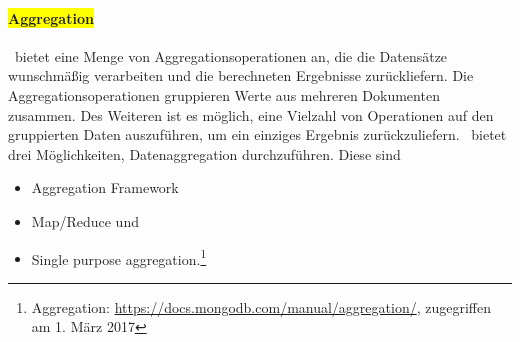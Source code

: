 %
%
%
%
%
%

\paragraph{\colorbox{yellow}{Aggregation}}\label{aggr}
\mongo\ bietet eine Menge von Aggregationsoperationen an, die die Datensätze wunschmäßig verarbeiten und die berechneten Ergebnisse zurückliefern. Die Aggregationsoperationen gruppieren Werte aus mehreren Dokumenten zusammen. Des Weiteren ist es möglich, eine Vielzahl von Operationen auf den gruppierten Daten auszuführen, um ein einziges Ergebnis zurückzuliefern. \mongo\ bietet drei Möglichkeiten, Datenaggregation durchzuführen. Diese sind 
\begin{itemize}
\item Aggregation Framework
\item Map/Reduce und
\item Single purpose aggregation.\footnote{Aggregation: \url{https://docs.mongodb.com/manual/aggregation/}, zugegriffen am 1. März 2017}
\end{itemize}

